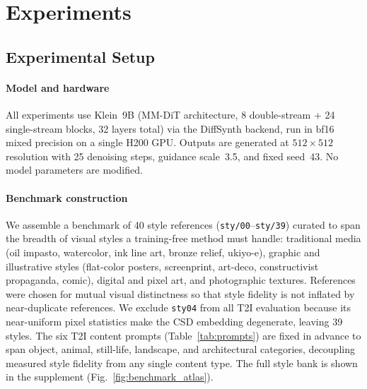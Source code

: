 \section{Experiments}
\label{sec:exp}

\subsection{Experimental Setup}
\label{sec:exp:setup}

\paragraph{Model and hardware}
All experiments use Klein~9B (MM-DiT architecture, 8 double-stream + 24
single-stream blocks, 32 layers total) via the DiffSynth backend, run in
bf16 mixed precision on a single H200 GPU.
Outputs are generated at $512 \times 512$ resolution with 25 denoising steps,
guidance scale~3.5, and fixed seed~43.
No model parameters are modified.

\paragraph{Benchmark construction}
We assemble a benchmark of 40 style references
(\texttt{sty/00}--\texttt{sty/39}) curated to span the breadth of visual styles a
training-free method must handle: traditional media (oil impasto, watercolor, ink
line art, bronze relief, ukiyo-e), graphic and illustrative styles (flat-color
posters, screenprint, art-deco, constructivist propaganda, comic), digital and
pixel art, and photographic textures. References were chosen for mutual visual
distinctness so that style fidelity is not inflated by near-duplicate references.
We exclude \texttt{sty04} from all T2I evaluation because its near-uniform pixel
statistics make the CSD embedding degenerate, leaving 39 styles.
The
six T2I content prompts (Table~\ref{tab:prompts}) are fixed in advance to span
object, animal, still-life, landscape, and architectural categories, decoupling
measured style fidelity from any single content type. The full style bank is
shown in the supplement (Fig.~\ref{fig:benchmark_atlas}).

